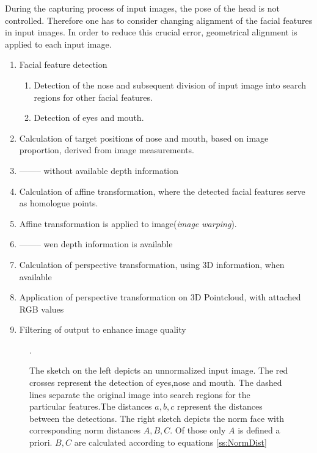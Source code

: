 During the capturing process of input images, the pose of the head is not controlled.
Therefore one has to consider changing alignment of the facial features in input images.
In order to reduce this crucial error, geometrical alignment is applied to each input image.
\begin{enumerate}
\item Facial feature detection
  \begin{enumerate}
  \item Detection of the nose and subsequent division of input image into search regions 
        for other facial features.
  \item Detection of eyes and mouth.
  \end{enumerate}
\item Calculation of target positions of nose and mouth, based on image proportion, derived
      from image measurements.
\item -------- without available depth information
\item Calculation of affine transformation, where the detected facial features serve as homologue
      points.
\item Affine transformation is applied to image(\textit{image warping}).
\item -------- wen depth information is available
\item Calculation of perspective transformation, using 3D information, when available
\item Application of perspective transformation on 3D Pointcloud, with attached RGB values
\item Filtering of output to enhance image quality

\end{enumerate}
\begin{figure}[h!tbp]
\centering
  \def\svgwidth{=0.8\textwidth }
  
\caption[Detection of facial features]{The sketch on the left depicts an unnormalized input image. The red crosses
        represent the detection of eyes,nose and mouth. The dashed lines separate the original image into search regions
        for the particular features.The distances $a,b,c$ represent the distances between the detections. The right sketch
        depicts the norm face with corresponding norm distances $A,B,C$. Of those only $A$ is defined a priori. $B,C$ are
        calculated according to equations \ref{ss:NormDist}}.
\label{fig:FeatDet}
\end{figure}

